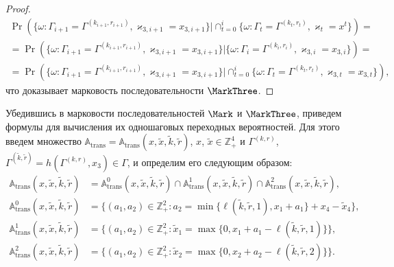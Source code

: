 \begin{proof}
\begin{multline*}
\Pr (\{ \omega\colon \Gamma_{i+1} =\Gamma^{(k_{i+1},  r_{i+1})},  \varkappa_{3,  i+1} = x_{3,  i+1}\} |\cap_{t=0}^{i}\{\omega\colon \Gamma_t=\Gamma^{(k_t,  r_t)},   \varkappa_t=x^t\})=\\
=\Pr (\{\omega\colon   \Gamma_{i+1} =\Gamma^{(k_{i+1},  r_{i+1})},  \varkappa_{3,  i+1} = x_{3,  i+1}\} |\{\omega\colon  \Gamma_i=\Gamma^{(k_i,  r_i)},   \varkappa_{3,  i}=x_{3,  i}\}) = \\
=\Pr (\{\omega\colon \Gamma_{i+1} =\Gamma^{(k_{i+1},  r_{i+1})},  \varkappa_{3,  i+1} = x_{3,  i+1}\} |\cap_{t=0}^{i}\{ \omega\colon \Gamma_t=\Gamma^{(k_t,  r_t)},   \varkappa_{3,  t}=x_{3,  t}\}),  
\end{multline*}
что доказывает марковость последовательности $\MarkThree$.
\end{proof}

Убедившись в марковости последовательностей $\Mark$ и $\MarkThree$,   приведем формулы для вычисления их одношаговых переходных вероятностей. Для этого введем множество ${\mathbb A}_{\mathrm{trans}} = {\mathbb A}_{\mathrm{trans}}(x,  \tilde{x},  \tilde{k},  \tilde{r})$,   $x$,   $\tilde{x}\in \mathbb{Z}_+^4$ и $\Gamma^{(k,  r)}$,   $\Gamma^{(\tilde{k},  \tilde{r})}=h(\Gamma^{(k,  r)},  x_3) \in \Gamma$,    и определим его следующим образом:
\begin{align}
{\mathbb A}_{\mathrm{trans}}(x,  \tilde{x},  \tilde{k},  \tilde{r}) &= {\mathbb A}_{\mathrm{trans}}^0(x,  \tilde{x},  \tilde{k},  \tilde{r}) \cap {\mathbb A}_{\mathrm{trans}}^1(x,  \tilde{x},  \tilde{k},  \tilde{r})\cap {\mathbb A}_{\mathrm{trans}}^2(x,  \tilde{x},  \tilde{k},  \tilde{r}),  \label{A:trans:1}\\
{\mathbb A}_{\mathrm{trans}}^0(x,  \tilde{x},  \tilde{k},  \tilde{r}) &= \{(a_1,  a_2) \in \mathbb{Z}_+^2 \colon a_2 = \min{\{\ell(\tilde{k},  \tilde{r},  1),   x_1+a_1}\} +x_4-\tilde{x}_4\},  \\
{\mathbb A}_{\mathrm{trans}}^1(x,  \tilde{x},  \tilde{k},  \tilde{r}) &= \{(a_1,  a_2) \in \mathbb{Z}_+^2 \colon \tilde{x}_1=\max{\{0,  x_1+a_1-\ell(\tilde{k},  \tilde{r},  1)\}}\},  \\
{\mathbb A}_{\mathrm{trans}}^2(x,  \tilde{x},  \tilde{k},  \tilde{r}) &= \{(a_1,  a_2) \in \mathbb{Z}_+^2 \colon  \tilde{x}_2=\max{\{0,  x_2+a_2-\ell(\tilde{k},  \tilde{r},  2)\}}\}.\label{A:trans:2}
\end{align}
